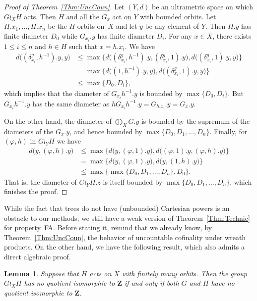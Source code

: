 \documentclass[a4paper]{article}
\newtheorem{lem}{Lemma}[section]
\theoremstyle{definition}
\newcommand*{\field}[1]{\mathbf{#1}}
\newcommand*{\Z}{\field{Z}}
\begin{document}
\begin{proof}[Proof of Theorem~\ref{Thm:UncCoun}]
Let $(Y,d)$ be an ultrametric space on which $G\wr_XH$ acts.
Then $H$ and all the $G_x$ act on $Y$ with bounded orbits.
Let $H.x_1,\dots, H.x_n$ be the $H$ orbits on~$X$ and let $y$ be any element of $Y$.
Then $H.y$ has finite diameter $D_0$ while $G_{x_i}.y$ has finite diameter $D_i$.
For any $x\in X$, there exists $1\leq i\leq n$ and $h\in H$ such that $x=h.x_i$.
We have
\begin{align*}
	d\bigl((\delta_{x_i}^g,h^{-1}).y,y\bigr)&\leq\max\{d\bigl((\delta_{x_i}^g,h^{-1}).y,(\delta_{x_i}^g,1).y\bigr),d\bigl((\delta_{x_i}^g,1).y,y\bigr)\}\\
	&=\max\{d\bigl((1,h^{-1}).y,y\bigr),d\bigl((\delta_{x_i}^g,1).y,y\bigr)\}\\
	&\leq \max\{D_0,D_i\},
\end{align*}
which implies that the diameter of $G_{x_i}h^{-1}.y$ is bounded by $\max\{D_0,D_i\}$.
But $G_{x_i}h^{-1}.y$ has the same diameter as $hG_{x_i}h^{-1}.y=G_{h.x_i}.y=G_x.y$.

On the other hand, the diameter of $\bigoplus_XG.y$ is bounded by the supremum of the diameters of the $G_{x}.y$, and hence bounded by $\max\{D_0,D_1,\dots,D_n\}$.
Finally, for $(\varphi,h)$ in $G\wr_YH$ we have
\begin{align*}
	d\bigl(y,(\varphi,h).y\bigr)&\leq\max\{d\bigl(y,(\varphi,1).y\bigr),d\bigl((\varphi,1).y,(\varphi,h).y\bigr)\}\\
	&=\max\{d\bigl(y,(\varphi,1).y\bigr),d\bigl(y,(1,h).y\bigr)\}\\
	&\leq\max\{\max\{D_0,D_1,\dots,D_n\},D_0\}.
\end{align*}
That is, the diameter of $G\wr_YH.z$ is itself bounded by $\max\{D_0,D_1,\dots,D_n\}$, which finishes the proof.
\end{proof}
%
%
While the fact that trees do not have (unbounded) Cartesian powers is an obstacle to our methods, we still have a weak version of Theorem~\ref{Thm:Technic} for property~FA.
Before stating it, remind that we already know, by Theorem~\ref{Thm:UncCoun}, the behavior of uncountable cofinality under wreath products.
On the other hand, we have the following result, which also admits a direct algebraic proof.
%
%
\begin{lem}\label{Lemma:Z}
Suppose that $H$ acts on $X$ with finitely many orbits.
Then the group $G\wr_XH$ has no quotient isomorphic to $\Z$ if and only if both $G$ and $H$ have no quotient isomorphic to $\Z$.
\end{lem}
\end{document}
